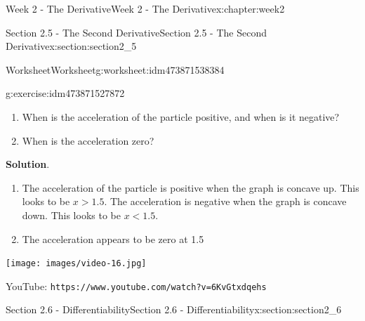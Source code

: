 \documentclass[oneside,10pt,]{book}
\newcommand{\blocktitlefont}{\relax}
\newcommand{\mono}[1]{\texttt{#1}}
\numberwithin{equation}{section}
\newlength{\qrsize}
\newlength{\previewwidth}
\begin{document}
\begin{chapterptx}{Week 2 - The Derivative}{}{Week 2 - The Derivative}{}{}{x:chapter:week2}
\begin{sectionptx}{Section 2.5 - The Second Derivative}{}{Section 2.5 - The Second Derivative}{}{}{x:section:section2_5}
\begin{worksheet-subsection}{Worksheet}{}{Worksheet}{}{}{g:worksheet:idm473871538384}
\begin{divisionexercise}{3}{}{}{g:exercise:idm473871527872}
\begin{image}{0}{1}{0}
\end{image}%
%
%
\begin{enumerate}[label=(\alph*)]
\item{}When is the acceleration of the particle positive, and when is it negative?%
\item{}When is the acceleration zero?%
\end{enumerate}
\textbf{\blocktitlefont Solution}.\hypertarget{g:solution:idm473871525584}{}\quad{}%
\begin{enumerate}[label=(\alph*)]
\item{}The acceleration of the particle is positive when the graph is concave up. This looks to be \(x>1.5\). The acceleration is negative when the graph is concave down. This looks to be \(x< 1.5\).%
\item{}The acceleration appears to be zero at 1.5%
\end{enumerate}
\end{divisionexercise}%
%
\end{worksheet-subsection}
\restoregeometry
\setlength{\qrsize}{9em}
\setlength{\previewwidth}{\linewidth}
\addtolength{\previewwidth}{-\qrsize}
\begin{tcbraster}[raster columns=2, raster column skip=1pt, raster halign=center, raster force size=false, raster left skip=0pt, raster right skip=0pt]%
\begin{tcolorbox}[previewstyle, width=\previewwidth]%
\texttt{[image: images/video-16.jpg]}%
\end{tcolorbox}%
\begin{tcolorbox}[qrstyle]%
{\hypersetup{urlcolor=black}}%
\end{tcolorbox}%
\begin{tcolorbox}[captionstyle]%
\small YouTube: \mono{https://www.youtube.com/watch?v=6KvGtxdqehs}\end{tcolorbox}%
\end{tcbraster}%
\end{sectionptx}
%
%
\typeout{************************************************}
\typeout{************************************************}
%
\begin{sectionptx}{Section 2.6 - Differentiability}{}{Section 2.6 - Differentiability}{}{}{x:section:section2_6}
\setlength{\qrsize}{9em}
\setlength{\previewwidth}{\linewidth}
\addtolength{\previewwidth}{-\qrsize}

\end{sectionptx}
\end{chapterptx}
\end{document}
